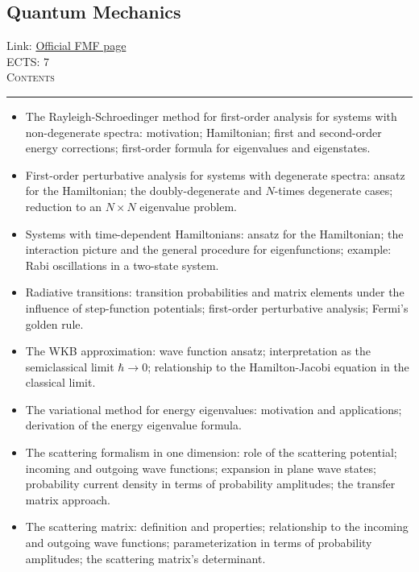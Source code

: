 \documentclass[11pt, a4paper]{article}
\newenvironment{course}[3]{
\subsection{#1}%
Link: \href{#2}{Official FMF page}\\%
ECTS: #3%
\vspace{1ex}
\\
{\large \textsc{Contents}}\\[-0.9ex]%
\rule{\textwidth}{0.5pt}
\vspace{-3ex}
}
{}
\newenvironment{chapter}[1]{
\begin{tcolorbox}[title=#1, breakable]
}
{\end{tcolorbox}}
\begin{document}
\begin{course}{Quantum Mechanics}{https://www.fmf.uni-lj.si/en/study-physics/programmes/1fiz/2020/7000777/courses/1156/}{7}
\begin{chapter}{Perturbation and approximation theory}
\begin{itemize}
            \item The Rayleigh-Schroedinger method for first-order analysis for systems with non-degenerate spectra: motivation; Hamiltonian; first and second-order energy corrections; first-order formula for eigenvalues and eigenstates.

            \item First-order perturbative analysis for systems with degenerate spectra: ansatz for the Hamiltonian; the doubly-degenerate and $ N $-times degenerate cases; reduction to an $ N \times N $ eigenvalue problem.

            \item Systems with time-dependent Hamiltonians: ansatz for the Hamiltonian; the interaction picture and the general procedure for eigenfunctions; example: Rabi oscillations in a two-state system.

            \item Radiative transitions: transition probabilities and matrix elements under the influence of step-function potentials; first-order perturbative analysis; Fermi's golden rule.

            \item The WKB approximation: wave function ansatz; interpretation as the semiclassical limit $ \hbar \to 0 $; relationship to the Hamilton-Jacobi equation in the classical limit.

            \item The variational method for energy eigenvalues: motivation and applications; derivation of the energy eigenvalue formula.
        
        \end{itemize}
    \end{chapter}

    \begin{chapter}{Introduction to scattering}
        \begin{itemize}
        
            \item The scattering formalism in one dimension: role of the scattering potential; incoming and outgoing wave functions; expansion in plane wave states; probability current density in terms of probability amplitudes; the transfer matrix approach.

            \item The scattering matrix: definition and properties; relationship to the incoming and outgoing wave functions; parameterization in terms of probability amplitudes; the scattering matrix's determinant.


\end{itemize}
\end{chapter}
\end{course}
\end{document}
